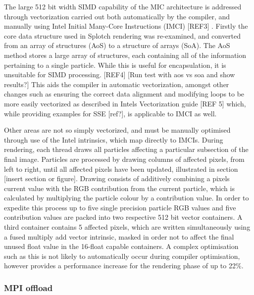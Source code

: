 \documentclass[runningheads,a4paper]{llncs}
\begin{document}
The large 512 bit width SIMD capability of the MIC architecture is addressed through vectorization carried out both 
automatically by the compiler, and manually using Intel Initial Many-Core Instructions (IMCI) [REF3] . Firstly the 
core data structure used in Splotch rendering was re-examined, and converted from an array of structures (AoS) to 
a structure of arrays (SoA). The AoS method stores a large array of structures, each containing all of the 
information pertaining to a single particle. While this is useful for encapsulation, it is unsuitable for SIMD 
processing. [REF4] [Run test with aos vs soa and show results?] This aids the compiler in automatic vectorization, 
amongst other changes such as ensuring the correct data alignment and modifying loops to be more easily vectorized 
as described in Intels Vectorization guide [REF 5] which, while providing examples for SSE [ref?], is applicable 
to IMCI as well. 

Other areas are not so simply vectorized, and must be manually optimised through use of the Intel intrinsics, 
which map directly to IMCIs. During rendering, each thread draws all particles affecting a particular subsection 
of the final image. Particles are processed by drawing columns of affected pixels, from left to right, until all 
affected pixels have been updated, illustrated in section [insert section or figure]. Drawing consists of additively 
combining a pixels current value with the RGB contribution from the current particle, which is calculated by 
multiplying the particle colour by a contribution value. In order to expedite this process up to five single 
precision particle RGB values and five contribution values are packed into two respective 512 bit vector containers. 
A third container contains 5 affected pixels, which are written simultaneously using a fused multiply add vector 
intrinsic, masked in order not to affect the final unused float value in the 16-float capable containers. A 
complex optimisation such as this is not likely to automatically occur during compiler optimisation, however 
provides a performance increase for the rendering phase of up to 22\%.

\subsubsection{MPI offload}
\label{sect:mpioffload}
\end{document}
